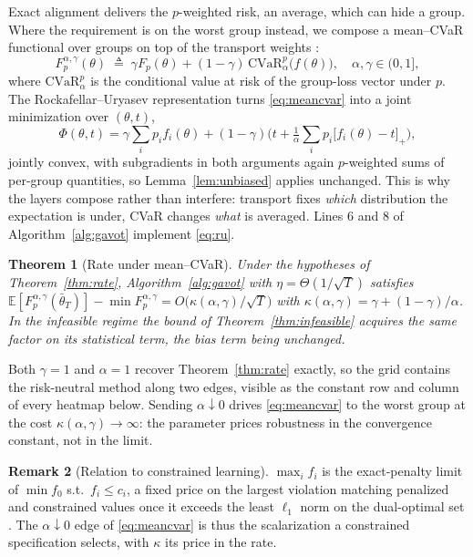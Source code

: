 \documentclass{article}
\newtheorem{theorem}{Theorem}
\theoremstyle{definition}
\newtheorem{remark}[theorem]{Remark}
\newcommand{\E}{\mathbb{E}}
\newcommand{\CVaR}{\mathrm{CVaR}}
\begin{document}
Exact alignment delivers the $p$-weighted risk, an average, which can hide a
group. Where the requirement is on the worst group instead, we compose a
mean--CVaR functional over groups on top of the transport weights
\cite{rahimi2025agnostic,rockafellar2000cvar}:
\begin{equation}
F_p^{\alpha,\gamma}(\theta)\;\triangleq\;\gamma F_p(\theta)+(1-\gamma)\,
\CVaR^p_\alpha\big(f(\theta)\big),\quad \alpha,\gamma\in(0,1],
\label{eq:meancvar}
\end{equation}
where $\CVaR^p_\alpha$ is the conditional value at risk of the group-loss vector
under $p$. The Rockafellar--Uryasev representation turns \eqref{eq:meancvar}
into a joint minimization over $(\theta,t)$,
\begin{equation}
\Phi(\theta,t)=\gamma\sum_i p_i f_i(\theta)+(1-\gamma)\Big(t+\tfrac{1}{\alpha}
\sum_i p_i\big[f_i(\theta)-t\big]_+\Big),
\label{eq:ru}
\end{equation}
jointly convex, with subgradients in both arguments again $p$-weighted sums of
per-group quantities, so Lemma~\ref{lem:unbiased} applies unchanged. This is why
the layers compose rather than interfere: transport fixes \emph{which}
distribution the expectation is under, CVaR changes \emph{what} is averaged.
Lines 6 and 8 of Algorithm~\ref{alg:gavot} implement \eqref{eq:ru}.

\begin{theorem}[Rate under mean--CVaR]
\label{thm:cvar}
Under the hypotheses of Theorem~\ref{thm:rate}, Algorithm~\ref{alg:gavot} with
$\eta=\Theta(1/\sqrt{T})$ satisfies
$\E[F_p^{\alpha,\gamma}(\bar\theta_T)]-\min F_p^{\alpha,\gamma}
=O\!\big(\kappa(\alpha,\gamma)/\sqrt{T}\big)$ with
$\kappa(\alpha,\gamma)=\gamma+(1-\gamma)/\alpha$. In the infeasible regime the
bound of Theorem~\ref{thm:infeasible} acquires the same factor on its
statistical term, the bias term being unchanged.
\end{theorem}

Both $\gamma=1$ and $\alpha=1$ recover Theorem~\ref{thm:rate} exactly, so the
grid contains the risk-neutral method along two edges, visible as the constant
row and column of every heatmap below. Sending $\alpha\downarrow 0$ drives
\eqref{eq:meancvar} to the worst group at the cost
$\kappa(\alpha,\gamma)\to\infty$: the parameter prices robustness in the
convergence constant, not in the limit.

\begin{remark}[Relation to constrained learning]
\label{rem:penalty}
$\max_i f_i$ is the exact-penalty limit of $\min f_0$ s.t.\ $f_i\le c_i$, a
fixed price on the largest violation matching penalized and constrained values
once it exceeds the least $\ell_1$ norm on the dual-optimal set
\cite{rahimi2026exactpenalty}. The $\alpha\downarrow 0$ edge of
\eqref{eq:meancvar} is thus the scalarization a constrained specification
selects, with $\kappa$ its price in the rate.
\end{remark}
\end{document}
